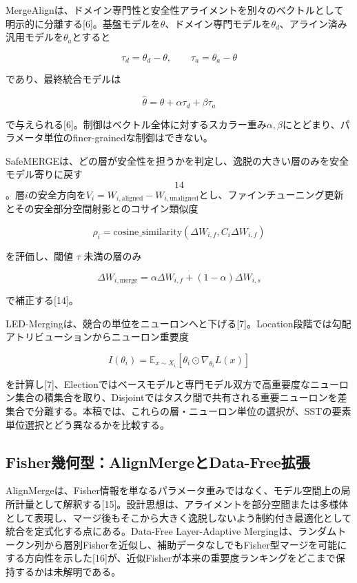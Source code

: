 \documentclass{article}
\begin{document}
MergeAlignは、ドメイン専門性と安全性アライメントを別々のベクトルとして明示的に分離する[6]。基盤モデルを\(\theta\)、ドメイン専門モデルを\(\theta_d\)、アライン済み汎用モデルを\(\theta_a\)とすると

\[
\tau_d=\theta_d-\theta,\qquad \tau_a=\theta_a-\theta
\tag{8}
\]

であり、最終統合モデルは

\[
\hat\theta=\theta+\alpha\tau_d+\beta\tau_a
\tag{9}
\]

で与えられる[6]。制御はベクトル全体に対するスカラー重み\(\alpha,\beta\)にとどまり、パラメータ単位のfiner-grainedな制御はできない。

SafeMERGEは、どの層が安全性を担うかを判定し、逸脱の大きい層のみを安全モデル寄りに戻す\[14\]。層\(i\)の安全方向を\(V_i=W_{i,\mathrm{aligned}}-W_{i,\mathrm{unaligned}}\)とし、ファインチューニング更新とその安全部分空間射影とのコサイン類似度

\[
\rho_i=\mathrm{cosine\_similarity}(\Delta W_{i,f},C_i\Delta W_{i,f})
\tag{10}
\]

を評価し、閾値 \(\tau\) 未満の層のみ

\[
\Delta W_{i,\mathrm{merge}}=\alpha\Delta W_{i,f}+(1-\alpha)\Delta W_{i,s}
\tag{11}
\]

で補正する[14]。

LED-Mergingは、競合の単位をニューロンへと下げる[7]。Location段階では勾配アトリビューションからニューロン重要度

\[
I(\theta_i)=\mathbb{E}_{x\sim X_i}[\theta_i\odot\nabla_{\theta_i}L(x)]
\tag{12}
\]

を計算し[7]、Electionではベースモデルと専門モデル双方で高重要度なニューロン集合の積集合を取り、Disjointではタスク間で共有される重要ニューロンを差集合で分離する。本稿では、これらの層・ニューロン単位の選択が、SSTの要素単位選択とどう異なるかを比較する。

\subsection{Fisher幾何型：AlignMergeとData-Free拡張}

AlignMergeは、Fisher情報を単なるパラメータ重みではなく、モデル空間上の局所計量として解釈する[15]。設計思想は、アライメントを部分空間または多様体として表現し、マージ後もそこから大きく逸脱しないよう制約付き最適化として統合を定式化する点にある。Data-Free Layer-Adaptive Mergingは、ランダムトークン列から層別Fisherを近似し、補助データなしでもFisher型マージを可能にする方向性を示した[16]が、近似Fisherが本来の重要度ランキングをどこまで保持するかは未解明である。
\end{document}
